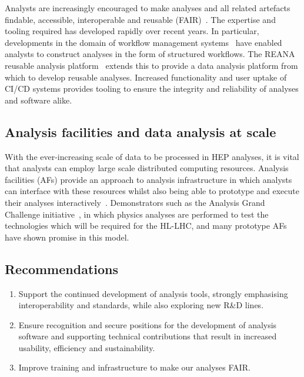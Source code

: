 \documentclass[10pt,a4paper]{article}
\begin{document}
Analysts are increasingly encouraged to make analyses and all related artefacts
findable, accessible, interoperable and reusable
(FAIR)~\cite{fairguiding,Chen_2022,Duarte:2022job,Fair4AIWorkshop}. The
expertise and tooling required has developed rapidly over recent years. In
particular, developments in the domain of workflow management
systems~\cite{cwl,snakemake,luigilaw,yadage} have enabled analysts to construct
analyses in the form of structured workflows. The REANA reusable analysis
platform~\cite{REANA} extends this to provide a data analysis platform from
which to develop reusable analyses. Increased functionality and user uptake of
CI/CD systems provides tooling to ensure the integrity and reliability of
analyses and software alike.

\subsection{Analysis facilities and data analysis at
scale}\label{analysis-facilities-and-data-analysis-at-scale}

With the ever-increasing scale of data to be processed in HEP analyses, it is
vital that analysts can employ large scale distributed computing resources.
Analysis facilities (AFs) provide an approach to analysis infrastructure in
which analysts can interface with these resources whilst also being able to
prototype and execute their analyses interactively~\cite{WLCG:ana_fac_wp}. Demonstrators
such as the Analysis Grand Challenge
initiative~\cite{Held:2022RC}, in which physics analyses
are performed to test the technologies which will be required for the HL-LHC,
and many prototype AFs~\cite{AF pilot ref?} have shown promise in this model.

\subsection{Recommendations}\label{recommendations-3}

\begin{enumerate}
\def\labelenumi{\arabic{enumi}.}
\item
  Support the continued development of analysis tools, strongly
  emphasising interoperability and standards, while also exploring new
  R\&D lines.
\item
  Ensure recognition and secure positions for the development of
  analysis software and supporting technical contributions that
  result in increased usability, efficiency and sustainability.
\item
  Improve training and infrastructure to make our analyses FAIR.
\end{enumerate}
\end{document}
